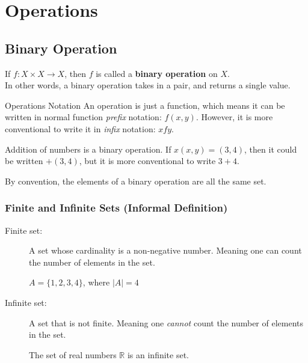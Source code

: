 \documentclass[../notes.tex]{subfiles}
\begin{document}
	\chapter{Operations}
		\section{Binary Operation}
			If $f: X \times X \rightarrow X$, then $f$ is called a \textbf{binary operation} on $X$.\\
			In other words, a binary operation takes in a pair, and returns a single value.
			\begin{notebox}{Operations Notation}
				An operation is just a function, which means it can be written in normal function \textit{prefix} notation: $f(x, y)$. However, it is more conventional to write it in \textit{infix} notation: $x f y$.
				\begin{examplebox}
					Addition of numbers is a binary operation. If $x(x, y) = (3, 4)$, then it could be written $+(3, 4)$, but it is more conventional to write $3 + 4$.
				\end{examplebox}
			\end{notebox}
			By convention, the elements of a binary operation are all the same set.
			\subsection[Finte and Infinite Sets]{Finite and Infinite Sets (Informal Definition)}
				\begin{description}
					\item[Finite set:] A set whose cardinality is a non-negative number. Meaning one can count the number of elements in the set.
						\begin{examplebox}
							$A = \{1, 2, 3, 4\}$, where $\left\lvert A\right\rvert = 4$
						\end{examplebox}
					\item[Infinite set:] A set that is not finite. Meaning one \textit{cannot} count the number of elements in the set.
						\begin{examplebox}
							The set of real numbers $\mathbb{R}$ is an infinite set.
						\end{examplebox}
				\end{description}
			\pagebreak
\end{document}
